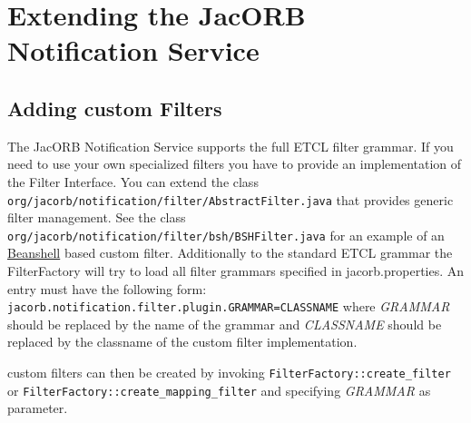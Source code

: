 \section{Extending the JacORB Notification Service}
\subsection{Adding custom Filters}

The JacORB Notification Service supports the full ETCL filter grammar. If you need to use your own specialized filters you have to provide an implementation of the Filter Interface. You can extend the class
\texttt{org/jacorb/notification/filter/AbstractFilter.java} that provides generic filter management.
See the class \texttt{org/jacorb/notification/filter/bsh/BSHFilter.java} for an example of an \href{http://www.beanshell.org/}{Beanshell} based custom filter.
Additionally to the standard ETCL grammar the FilterFactory will try to
load all filter grammars specified in jacorb.properties.
An entry must have the following form:
\texttt{jacorb.notification.filter.plugin.GRAMMAR=CLASSNAME} where \emph{GRAMMAR} should be replaced by the name of the grammar and \emph{CLASSNAME} should be replaced by the classname of the custom filter implementation.

custom filters can then be created by invoking \texttt{FilterFactory::create\_filter} or \texttt{FilterFactory::create\_mapping\_filter} and specifying \emph{GRAMMAR} as parameter.



